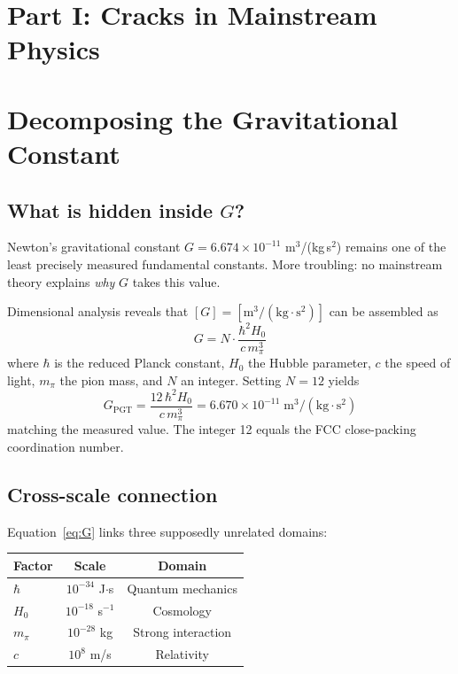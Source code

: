 \documentclass[12pt,a4paper,twocolumn]{article}
\begin{document}
\section*{Part I: Cracks in Mainstream Physics}

\section{Decomposing the Gravitational Constant}

\subsection{What is hidden inside $G$?}

Newton's gravitational constant $G = 6.674\times10^{-11}$ m$^3$/(kg\,s$^2$) remains one of the least precisely measured fundamental constants. More troubling: no mainstream theory explains \emph{why} $G$ takes this value.

Dimensional analysis reveals that $[G] = [\text{m}^3/(\text{kg}\cdot\text{s}^2)]$ can be assembled as
\begin{equation}
G = N \cdot \frac{\hbar^2 H_0}{c\,m_\pi^3}
\label{eq:G}
\end{equation}
where $\hbar$ is the reduced Planck constant, $H_0$ the Hubble parameter, $c$ the speed of light, $m_\pi$ the pion mass, and $N$ an integer. Setting $N=12$ yields
\begin{equation}
G_{\mathrm{PGT}} = \frac{12\,\hbar^2 H_0}{c\,m_\pi^3} = 6.670\times10^{-11}\;\text{m}^3/(\text{kg}\cdot\text{s}^2)
\end{equation}
matching the measured value. The integer 12 equals the FCC close-packing coordination number.

\subsection{Cross-scale connection}

Equation~\eqref{eq:G} links three supposedly unrelated domains:

\begin{center}
\small
\begin{tabular}{@{}lcc@{}}
\toprule
Factor & Scale & Domain \\
\midrule
$\hbar$ & $10^{-34}$ J$\cdot$s & Quantum mechanics \\
$H_0$ & $10^{-18}$ s$^{-1}$ & Cosmology \\
$m_\pi$ & $10^{-28}$ kg & Strong interaction \\
$c$ & $10^{8}$ m/s & Relativity \\
\bottomrule
\end{tabular}
\end{center}
\end{document}

